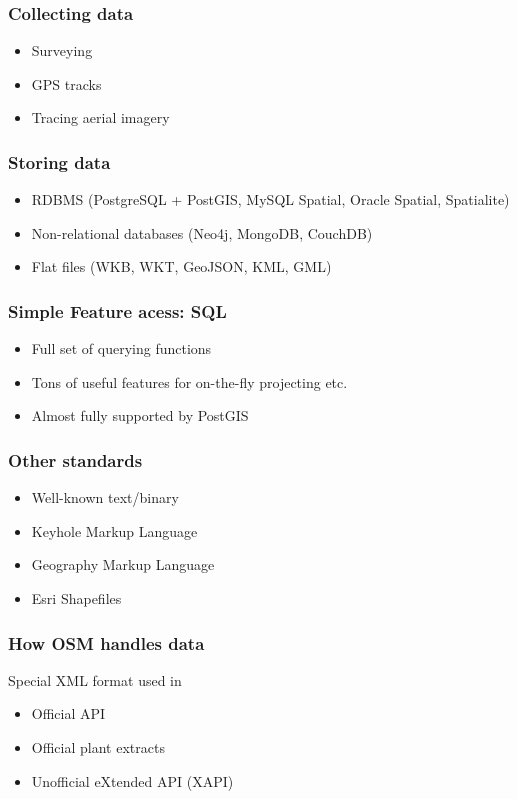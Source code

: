 \documentclass[17pt]{beamer}
\begin{document}
\begin{frame}
  \frametitle{Collecting data}
  \begin{itemize}
  \item Surveying
  \item GPS tracks
  \item Tracing aerial imagery
  \end{itemize}
\end{frame}

\begin{frame}
  \frametitle{Storing data}
  \begin{itemize}
  \item RDBMS (PostgreSQL + PostGIS, MySQL Spatial, Oracle Spatial, Spatialite)
  \item Non-relational databases (Neo4j, MongoDB, CouchDB)
  \item Flat files (WKB, WKT, GeoJSON, KML, GML)
  \end{itemize}
\end{frame}

\begin{frame}
  \frametitle{Simple Feature acess: SQL}
  \begin{itemize}
  \item Full set of querying functions
  \item Tons of useful features for on-the-fly projecting etc.
  \item Almost fully supported by PostGIS
  \end{itemize}
\end{frame}

\begin{frame}
  \frametitle{Other standards}
  \begin{itemize}
  \item Well-known text/binary
  \item Keyhole Markup Language
  \item Geography Markup Language
  \item Esri Shapefiles
  \end{itemize}
\end{frame}

\begin{frame}
  \frametitle{How OSM handles data}
  Special XML format used in
  \begin{itemize}
  \item Official API
  \item Official plant extracts
  \item Unofficial eXtended API (XAPI)
  \end{itemize}
\end{frame}
\end{document}
